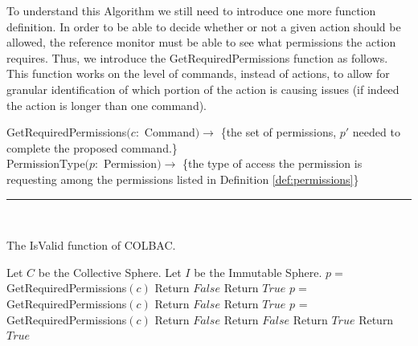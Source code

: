 To understand this Algorithm we still need to introduce one more function
definition. In order to be able to decide whether or not a given action should
be allowed, the reference monitor must be able to see what permissions the
action requires. Thus, we introduce the GetRequiredPermissions function as
follows. This function works on the level of commands, instead of actions, to
allow for granular identification of which portion of the action is causing
issues (if indeed the action is longer than one command).

\begin{definition}
GetRequiredPermissions$(c:$ Command$) \rightarrow$ \{the set of permissions,
$p'$ needed to complete the proposed command.\}\\
PermissionType$(p:$ Permission$) \rightarrow $ \{the type of access the
permission is requesting among the permissions listed in Definition
\ref{def:permissions}\}\\
\hrule\mbox{}\\
\end{definition}

\begin{algorithm}
\caption{The IsValid function of COLBAC.}
\label{alg:isvalid}
\begin{algorithmic}[1]
\State Let $C$ be the Collective Sphere.
\State Let $I$ be the Immutable Sphere.
         
            \State $p =$ GetRequiredPermissions$(c)$
                \State Return $False$
            \EndIf
        \EndFor
        \State Return $True$
    \Else
        \State $p =$ GetRequiredPermissions$(c)$
            \State Return $False$
        \EndIf
        \State Return $True$
    \EndIf
{}
     
        \State $p$ = GetRequiredPermissions$(c)$
            \State Return $False$
                \State Return $False$
            \EndIf
            \State Return $True$
        \Else {}
            \State Return $True$
        \EndIf
    \EndFor
\EndIf
\EndProcedure
\end{algorithmic}
\end{algorithm}

